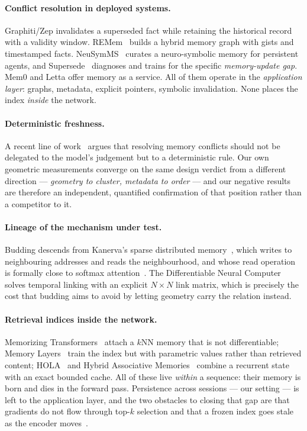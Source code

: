 \documentclass[11pt,a4paper]{article}
\begin{document}
\paragraph{Conflict resolution in deployed systems.} Graphiti/Zep invalidates a superseded fact while
retaining the historical record with a validity window. REMem~\cite{remem} builds a hybrid memory
graph with gists and timestamped facts. NeuSymMS~\cite{neusymms} curates a neuro-symbolic memory for
persistent agents, and Supersede~\cite{supersede} diagnoses and trains for the specific
\emph{memory-update gap}. Mem0 and Letta offer memory as a service. All of them operate in the
\emph{application layer}: graphs, metadata, explicit pointers, symbolic invalidation. None places the
index \emph{inside} the network.

\paragraph{Deterministic freshness.} A recent line of work~\cite{freshness} argues that resolving
memory conflicts should not be delegated to the model's judgement but to a deterministic rule. Our
own geometric measurements converge on the same design verdict from a different direction ---
\emph{geometry to cluster, metadata to order} --- and our negative results are therefore an
independent, quantified confirmation of that position rather than a competitor to it.

\paragraph{Lineage of the mechanism under test.} Budding descends from Kanerva's sparse distributed
memory~\cite{kanerva}, which writes to neighbouring addresses and reads the neighbourhood, and whose
read operation is formally close to softmax attention~\cite{sdmattention}. The Differentiable Neural
Computer~\cite{dnc} solves temporal linking with an explicit $N \times N$ link matrix, which is
precisely the cost that budding aims to avoid by letting geometry carry the relation instead.

\paragraph{Retrieval indices inside the network.} Memorizing Transformers~\cite{memorizing} attach a
$k$NN memory that is not differentiable; Memory Layers~\cite{memlayers} train the index but with
parametric values rather than retrieved content; HOLA~\cite{hola} and Hybrid Associative
Memories~\cite{ham} combine a recurrent state with an exact bounded cache. All of these live
\emph{within} a sequence: their memory is born and dies in the forward pass. Persistence across
sessions --- our setting --- is left to the application layer, and the two obstacles to closing that
gap are that gradients do not flow through top-$k$ selection and that a frozen index goes stale as
the encoder moves~\cite{basu,querydrift}.
\end{document}
